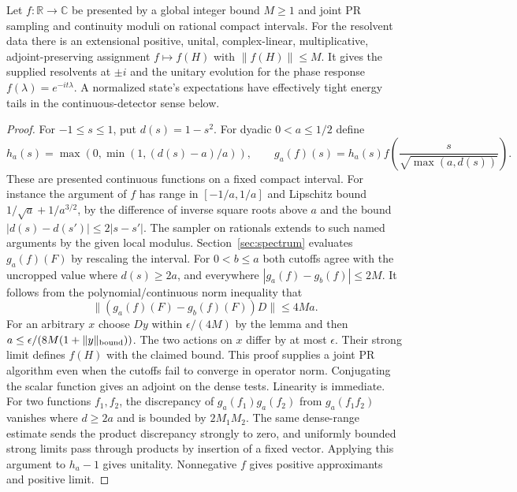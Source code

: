\begin{theorem}\label{thm:unbounded-calculus}
Let $f:\mathbb R\to\mathbb C$ be presented by a global integer bound $M\ge1$ and joint PR sampling and continuity moduli on rational compact intervals. For the resolvent data there is an extensional positive, unital, complex-linear, multiplicative, adjoint-preserving assignment $f\mapsto f(H)$ with $\|f(H)\|\le M$. It gives the supplied resolvents at $\pm i$ and the unitary evolution for the phase response $f(\lambda)=e^{-it\lambda}$. A normalized state's expectations have effectively tight energy tails in the continuous-detector sense below.
\end{theorem}
\begin{proof}
For $-1\le s\le1$, put $d(s)=1-s^2$. For dyadic $0<a\le1/2$ define
\[
 h_a(s)=\max(0,\min(1,(d(s)-a)/a)),\qquad
 g_a(f)(s)=h_a(s) f\!\left(\frac{s}{\sqrt{\max(a,d(s))}}\right).
\]
These are presented continuous functions on a fixed compact interval. For instance the argument of $f$ has range in $[-1/a,1/a]$ and Lipschitz bound $1/\sqrt a+1/a^{3/2}$, by the difference of inverse square roots above $a$ and the bound $|d(s)-d(s')|\le2|s-s'|$. The sampler on rationals extends to such named arguments by the given local modulus. Section~\ref{sec:spectrum} evaluates $g_a(f)(F)$ by rescaling the interval.
For $0<b\le a$ both cutoffs agree with the uncropped value where $d(s)\ge2a$, and everywhere $|g_a(f)-g_b(f)|\le2M$. It follows from the polynomial/continuous norm inequality that
\[
 \|(g_a(f)(F)-g_b(f)(F))D\|\le4Ma.
\]
For an arbitrary $x$ choose $Dy$ within $\epsilon/(4M)$ by the lemma and then $a\le \epsilon/(8M(1+\|y\|_{\rm bound}))$. The two actions on $x$ differ by at most $\epsilon$. Their strong limit defines $f(H)$ with the claimed bound. This proof supplies a joint PR algorithm even when the cutoffs fail to converge in operator norm. Conjugating the scalar function gives an adjoint on the dense tests. Linearity is immediate. For two functions $f_1,f_2$, the discrepancy of $g_a(f_1)g_a(f_2)$ from $g_a(f_1 f_2)$ vanishes where $d\ge2a$ and is bounded by $2M_1M_2$. The same dense-range estimate sends the product discrepancy strongly to zero, and uniformly bounded strong limits pass through products by insertion of a fixed vector. Applying this argument to $h_a-1$ gives unitality. Nonnegative $f$ gives positive approximants and positive limit.


\end{proof}
